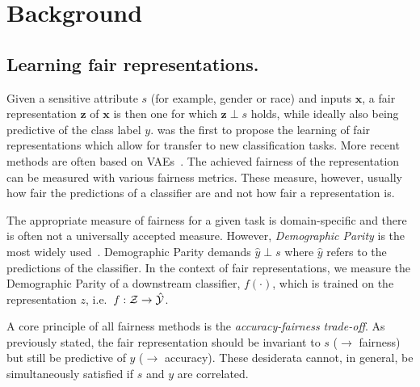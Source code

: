 \section{Background}\label{sec:background}

\subsection{Learning fair representations.}
Given a sensitive attribute $s$ (for example, gender or race) and inputs $\bm{x}$, a fair
representation $\bm{z}$ of $\bm{x}$ is then one for which $\bm{z} \perp s$ holds, while ideally
also being predictive of the class label $y$. \citet{zemel2013learning} was the first to propose
the learning of fair representations which allow for transfer to new classification tasks. More
recent methods are often based on
\acfp{VAE}~\citep{kingma2013auto,louizos2016variational,edwards2016censoring,beutel2017data}. The
achieved fairness of the representation can be measured with various fairness metrics. These
measure, however, usually how fair the predictions of a classifier are and not how fair a
representation is.

The appropriate measure of fairness for a given task is domain-specific \citep{liu2018delayed} and
there is often not a universally accepted measure. However, \emph{Demographic Parity} is the most
widely used~\citep{louizos2016variational,edwards2016censoring,beutel2017data}. Demographic Parity
demands $\hat{y} \perp s$ where $\hat{y}$ refers to the predictions of the classifier. In the
context of fair representations, we measure the Demographic Parity of a downstream classifier,
$f(\cdot )$, which is trained on the representation $z$, i.e.\  $f: {\mathcal{Z}} \to \hat{{\mathcal{Y}}}$.

A core principle of all fairness methods is the \emph{accuracy-fairness trade-off}. As previously
stated, the fair representation should be invariant to $s$ ($\to$ fairness) but still be predictive
of $y$ ($\to$ accuracy). These desiderata cannot, in general, be simultaneously satisfied if $s$
and $y$ are correlated.


